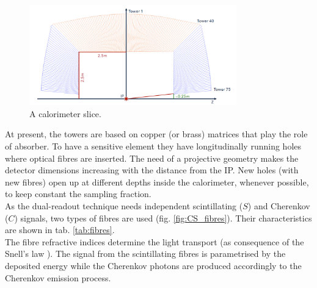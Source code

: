 \begin{figure}
	\centering
	\includegraphics[width=0.8\textwidth]{IMG/DRCGeometry1}
	\caption{A calorimeter slice.}
	\label{fig:cal_slices}
\end{figure}

At present, the towers are based on copper (or brass) matrices that play the role of absorber. To have a sensitive element they have longitudinally running holes where optical fibres are inserted. The need of a projective geometry makes the detector dimensions increasing with the distance from the IP. New holes (with new fibres) open up at different depths inside the calorimeter, whenever possible, to keep constant the sampling fraction.\\
As the dual-readout technique needs independent scintillating ($S$) and Cherenkov ($C$) signals, two types of fibres are used (fig. \ref{fig:CS_fibres}). Their characteristics are shown in tab. \ref{tab:fibres}.\\
The fibre refractive indices determine the light transport (as consequence of the Snell's law \cite{Snell}). The signal from the scintillating fibres is parametrised by the deposited energy while the Cherenkov photons are produced accordingly to the Cherenkov emission process.\\

